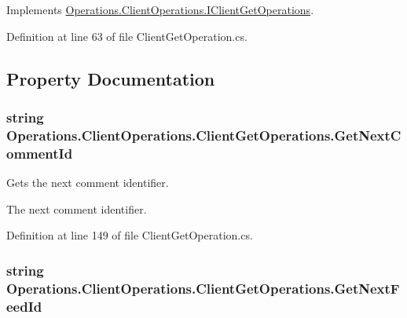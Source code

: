Implements \hyperlink{interface_operations_1_1_client_operations_1_1_i_client_get_operations_ad082c4c82e7cd14d578720d367bb3b3b}{Operations.\+Client\+Operations.\+I\+Client\+Get\+Operations}.



Definition at line 63 of file Client\+Get\+Operation.\+cs.



\subsection{Property Documentation}
\subsubsection[{\texorpdfstring{Get\+Next\+Comment\+Id}{GetNextCommentId}}]{\setlength{\rightskip}{0pt plus 5cm}string Operations.\+Client\+Operations.\+Client\+Get\+Operations.\+Get\+Next\+Comment\+Id\hspace{0.3cm}{\ttfamily [get]}}\hypertarget{class_operations_1_1_client_operations_1_1_client_get_operations_ad6c8a8843f9039915ee5c47d6ca5536b}{}\label{class_operations_1_1_client_operations_1_1_client_get_operations_ad6c8a8843f9039915ee5c47d6ca5536b}


Gets the next comment identifier. 

The next comment identifier.

Definition at line 149 of file Client\+Get\+Operation.\+cs.

\subsubsection[{\texorpdfstring{Get\+Next\+Feed\+Id}{GetNextFeedId}}]{\setlength{\rightskip}{0pt plus 5cm}string Operations.\+Client\+Operations.\+Client\+Get\+Operations.\+Get\+Next\+Feed\+Id\hspace{0.3cm}{\ttfamily [get]}}\hypertarget{class_operations_1_1_client_operations_1_1_client_get_operations_aec911a8916000179440a1e4df7dc9ad7}{}\label{class_operations_1_1_client_operations_1_1_client_get_operations_aec911a8916000179440a1e4df7dc9ad7}


